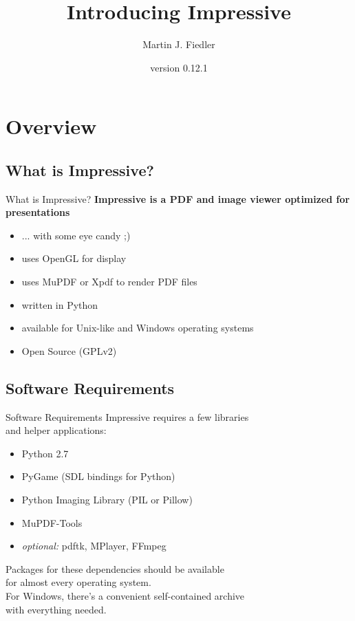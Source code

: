 \documentclass[bigger,hyperref={colorlinks=true,linkcolor=white,urlcolor=blue}]{beamer}
\title{Introducing Impressive}
\author{Martin J. Fiedler}
\date{version 0.12.1}
\begin{document}
\maketitle


\section{Overview}

\subsection{What is Impressive?}
\begin{frame}{What is Impressive?}
    \large
    \textbf{Impressive is a PDF and image viewer optimized for presentations}
    \normalsize
    \begin{itemize}
        \item ... with some eye candy ;)
        \item uses OpenGL for display
        \item uses MuPDF or Xpdf to render PDF files
        \item written in Python
        \item available for Unix-like and Windows operating systems
        \item Open Source (GPLv2)
    \end{itemize}
\end{frame}

\subsection{Software Requirements}
\begin{frame}{Software Requirements}
    Impressive requires a few libraries \\ and helper applications:
    \begin{itemize}
        \item Python 2.7
        \item PyGame (SDL bindings for Python)
        \item Python Imaging Library (PIL or Pillow)
        \item MuPDF-Tools
        \item \emph{optional:} pdftk, MPlayer, FFmpeg
    \end{itemize}
    Packages for these dependencies should be available \\
    for almost every operating system. \\
    For Windows, there's a convenient self-contained archive \\
    with everything needed.
\end{frame}
\end{document}

